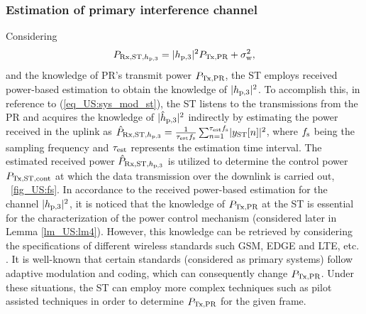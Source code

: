 \subsubsection{Estimation of primary interference channel}
Considering
\begin{equation}
P_{\text{Rx,ST,$h_{\text{p,3}}$}} = |h_{\text{p,3}}|^2 P_{\text{Tx,PR}} + \sigma^2_{\text{w}} \label{eq_US:prcvd}, 
\end{equation}
and the knowledge of PR's transmit power $P_{\text{Tx,PR}}$, the ST employs received power-based estimation to obtain the knowledge of $|h_{\text{p,3}}|^2$. To accomplish this, in reference to (\ref{eq_US:sys_mod_st}), the ST listens to the transmissions from the PR and acquires the knowledge of $|\hat{h}_{\text{p,3}}|^2$ indirectly by estimating the power received in the uplink as $\hat{P}_{\text{Rx,ST,$h_{\text{p,3}}$}} = {\frac{1}{{\tau_{\text{est}} f_{\text{s}}}}\sum_{n=1}^{\tau_{\text{est}} f_{\text{s}}}} {|y_{\text{ST}}[n]|^2}$, where $f_{\text{s}}$ being the sampling frequency and $\tau_{\text{est}}$ represents the estimation time interval. 
The estimated received power $\hat{P}_{\text{Rx,ST,$h_{\text{p,3}}$}}$ is utilized to determine the control power $P_{\text{Tx,ST,cont}}$ at which the data transmission over the downlink is carried out, \figurename~\ref{fig_US:fs}. In accordance to the received power-based estimation for the channel $|h_{\text{p,3}}|^2$, it is noticed that the knowledge of $P_{\text{Tx,PR}}$ at the ST is essential for the characterization of the power control mechanism (considered later in Lemma \ref{lm_US:lm4}). However, this knowledge can be retrieved by considering the specifications of different wireless standards such GSM, EDGE and LTE, etc. \cite{Sharma14}. It is well-known that certain standards (considered as primary systems) follow adaptive modulation and coding, which can consequently change $P_{\text{Tx,PR}}$. Under these situations, the ST can employ more complex techniques such as pilot assisted techniques in order to determine $P_{\text{Tx,PR}}$ for the given frame.

